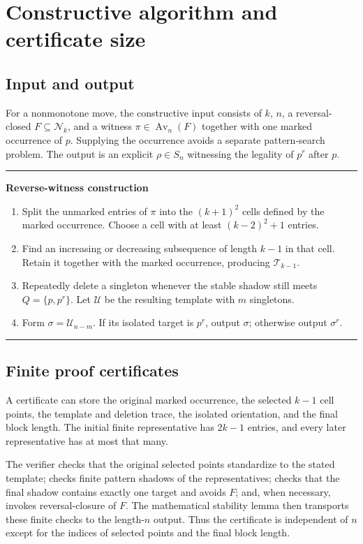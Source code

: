 \documentclass[11pt,a4paper]{article}
\theoremstyle{definition}
\theoremstyle{remark}
\DeclareMathOperator{\Av}{Av}
\newcommand{\Nk}{\mathcal N_k}
\newcommand{\Tm}{\mathcal T}
\newcommand{\Um}{\mathcal U}
\begin{document}
\section{Constructive algorithm and certificate size}
\label{sec:algorithm}

\subsection{Input and output}
For a nonmonotone move, the constructive input consists of $k$, $n$, a
reversal-closed $F\subseteq\Nk$, and a witness $\pi\in\Av_n(F)$ together with
one marked occurrence of $p$. Supplying the occurrence avoids a separate
pattern-search problem. The output is an explicit $\rho\in S_n$ witnessing
the legality of $p^r$ after $p$.

\begin{center}
\begin{minipage}{0.94\linewidth}
\hrule\medskip
\textbf{Reverse-witness construction}
\begin{enumerate}[label=\arabic*.,leftmargin=1.6em]
\item Split the unmarked entries of $\pi$ into the $(k+1)^2$ cells defined
by the marked occurrence. Choose a cell with at least $(k-2)^2+1$ entries.
\item Find an increasing or decreasing subsequence of length $k-1$ in that
cell. Retain it together with the marked occurrence, producing $\Tm_{k-1}$.
\item Repeatedly delete a singleton whenever the stable shadow still meets
$Q=\{p,p^r\}$. Let $\Um$ be the resulting template with $m$ singletons.
\item Form $\sigma=\Um_{n-m}$. If its isolated target is $p^r$, output
$\sigma$; otherwise output $\sigma^r$.
\end{enumerate}
\medskip\hrule
\end{minipage}
\end{center}

\subsection{Finite proof certificates}
A certificate can store the original marked occurrence, the selected
$k-1$ cell points, the template and deletion trace, the isolated orientation,
and the final block length. The initial finite representative has $2k-1$
entries, and every later representative has at most that many.

The verifier checks that the original selected points standardize to the
stated template; checks finite pattern shadows of the representatives;
checks that the final shadow contains exactly one target and avoids $F$;
and, when necessary, invokes reversal-closure of $F$. The mathematical
stability lemma then transports these finite checks to the length-$n$
output. Thus the certificate is independent of $n$ except for the indices
of selected points and the final block length.
\end{document}
